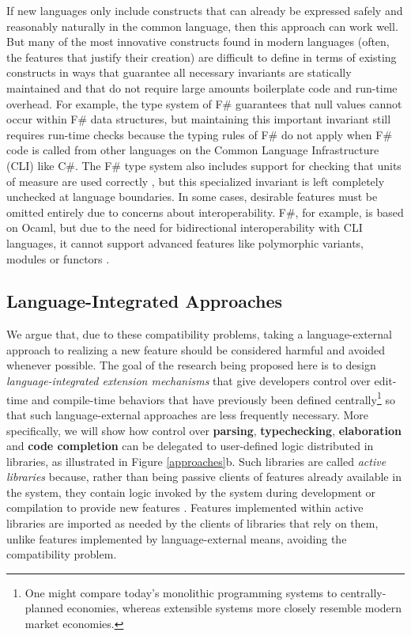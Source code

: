 If new languages only include constructs that can already be expressed safely and reasonably naturally in the common language, then this approach can work well.
But many of the most innovative constructs found in modern languages (often, the features that justify their creation) are difficult to define in terms of existing constructs in ways that guarantee all necessary invariants are statically maintained and that do not require large amounts boilerplate code and run-time overhead. For example, the type system of F\# guarantees that null values cannot occur within F\# data structures, but maintaining this important invariant still requires run-time checks because the typing rules of F\# do not apply when F\# code is called from other languages on the Common Language Infrastructure (CLI) like C\#. The F\# type system also includes support for checking that units of measure are used correctly \cite{syme2012expert, kennedy1994dimension}, but this specialized invariant is left completely unchecked at language boundaries. 
In some cases, desirable features must be omitted entirely due to concerns about  interoperability. F\#, for example, is based on Ocaml, but due to the need for bidirectional interoperability with CLI languages, it cannot support advanced features like polymorphic variants, modules or functors \cite{ocaml-manual}.

\subsection{Language-Integrated Approaches}
We argue that, due to these compatibility problems, taking a language-external approach to realizing a new feature should be considered harmful and avoided whenever possible. The goal of the research being proposed here is to design \emph{language-integrated extension mechanisms} that give developers control over edit-time and compile-time behaviors that have previously been defined centrally\footnote{One might compare today's monolithic programming systems to  {centrally-planned} economies, whereas extensible\- systems more closely resemble modern market economies.} so that such language-external approaches are less frequently necessary. More specifically, we will show how control over \textbf{parsing}, \textbf{typechecking}, \textbf{elaboration} and \textbf{code completion} can be delegated to user-defined logic distributed in {libraries}, as illustrated in Figure \ref{approaches}b. 
Such libraries are called \emph{active libraries} because, rather than being passive clients of features already available in the system, they contain logic invoked by the system during development or compilation to provide new features  \cite{active-libraries}. Features implemented within active libraries are imported as needed by the clients of libraries that rely on them, unlike features implemented by language-external means, avoiding the compatibility problem.

